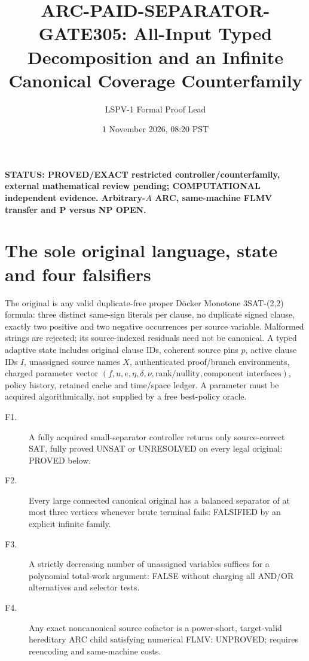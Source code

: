 \documentclass[11pt]{article}
\title{ARC-PAID-SEPARATOR-GATE305: All-Input Typed Decomposition and an Infinite Canonical Coverage Counterfamily}
\author{LSPV-1 Formal Proof Lead}
\date{1 November 2026, 08:20 PST}
\begin{document}
\maketitle
\noindent\textbf{STATUS: PROVED/EXACT restricted controller/counterfamily, external mathematical review pending; COMPUTATIONAL independent evidence. Arbitrary-$A$ ARC, same-machine FLMV transfer and P versus NP OPEN.}

\section{The sole original language, state and four falsifiers}
The original is any valid duplicate-free proper D\"ocker Monotone 3SAT-(2,2) formula: three distinct same-sign literals per clause, no duplicate signed clause, exactly two positive and two negative occurrences per source variable. Malformed strings are rejected; its source-indexed residuals need not be canonical. A typed adaptive state includes original clause IDs, coherent source pins $p$, active clause IDs $I$, unassigned source names $X$, authenticated proof/branch environments, charged parameter vector $(f,u,e,\eta,\delta,\nu,\text{rank/nullity},\text{component interfaces})$, policy history, retained cache and time/space ledger. A parameter must be acquired algorithmically, not supplied by a free best-policy oracle.

\begin{description}
\item[F1.] A fully acquired small-separator controller returns only source-correct SAT, fully proved UNSAT or UNRESOLVED on every legal original: PROVED below.
\item[F2.] Every large connected canonical original has a balanced separator of at most three vertices whenever brute terminal fails: FALSIFIED by an explicit infinite family.
\item[F3.] A strictly decreasing number of unassigned variables suffices for a polynomial total-work argument: FALSE without charging all AND/OR alternatives and selector tests.
\item[F4.] Any exact noncanonical source cofactor is a power-short, target-valid hereditary ARC child satisfying numerical FLMV: UNPROVED; requires reencoding and same-machine costs.
\end{description}
\end{document}
